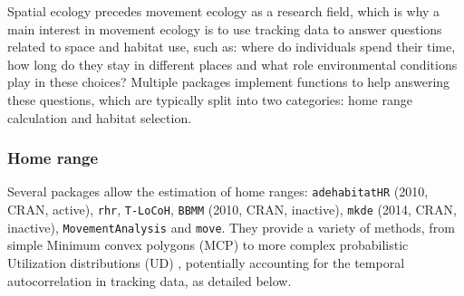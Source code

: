 \documentclass[a4paper,12pt]{article}
\newcommand{\Rpkg}[1]{\texttt{#1}}
\begin{document}
Spatial ecology precedes movement ecology as a research field, which is why a main interest in movement ecology is to use tracking data to answer questions related to space and habitat use, such as: where do individuals spend their time, how long do they stay in different places and what role environmental conditions play in these choices? Multiple packages implement functions to help answering these questions, which are typically split into two categories: home range calculation and habitat selection.

\subsubsection*{Home range}

Several packages allow the estimation of home ranges: \Rpkg{adehabitatHR} (2010, CRAN, active), \Rpkg{rhr}, \Rpkg{T-LoCoH}, \Rpkg{BBMM} (2010, CRAN, inactive), \Rpkg{mkde} (2014, CRAN, inactive), \Rpkg{MovementAnalysis} and \Rpkg{move}. They provide a variety of methods, from simple Minimum convex polygons (MCP) \citep{Mohr1947} to more complex probabilistic Utilization distributions (UD) \citep{VanWinkle1975}, potentially accounting for the temporal autocorrelation in tracking data, as detailed below.
\end{document}
